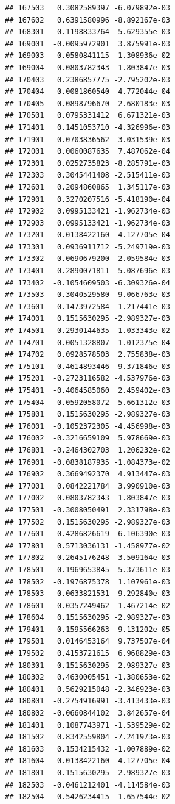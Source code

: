 \documentclass[ignorenonframetext,]{beamer}
\begin{document}
\begin{frame}[fragile]
\begin{verbatim}
## 167503   0.3082589397 -6.079892e-03
## 167602   0.6391580996 -8.892167e-03
## 168301  -0.1198833764  5.629355e-03
## 169001  -0.0095972901  3.875991e-03
## 169003  -0.0580841115  1.308936e-02
## 169004  -0.0803782343  1.803847e-03
## 170403   0.2386857775 -2.795202e-03
## 170404  -0.0081860540  4.772044e-04
## 170405   0.0898796670 -2.680183e-03
## 170501   0.0795331412  6.671321e-03
## 171401   0.1451053710 -4.326996e-03
## 171901  -0.0703836562 -3.031539e-03
## 172001   0.0060087635  7.487062e-04
## 172301   0.0252735823 -8.285791e-03
## 172303   0.3045441408 -2.515411e-03
## 172601   0.2094860865  1.345117e-03
## 172901   0.3270207516 -5.418190e-04
## 172902   0.0995133421 -1.962734e-03
## 172903   0.0995133421 -1.962734e-03
## 173201  -0.0138422160  4.127705e-04
## 173301   0.0936911712 -5.249719e-03
## 173302  -0.0690679200  2.059584e-03
## 173401   0.2890071811  5.087696e-03
## 173402  -0.1054609503 -6.309326e-04
## 173503   0.3040529580 -9.066763e-03
## 173601  -0.1473972584  1.217441e-03
## 174001   0.1515630295 -2.989327e-03
## 174501  -0.2930144635  1.033343e-02
## 174701  -0.0051328807  1.012375e-04
## 174702   0.0928578503  2.755838e-03
## 175101   0.4614893446 -9.371846e-03
## 175201  -0.2723116582 -4.537976e-03
## 175401  -0.4064585060  2.459402e-03
## 175404   0.0592058072  5.661312e-03
## 175801   0.1515630295 -2.989327e-03
## 176001  -0.1052372305 -4.456998e-03
## 176002  -0.3216659109  5.978669e-03
## 176801  -0.2464302703  1.206232e-02
## 176901  -0.0838187935 -1.084373e-02
## 176902   0.3669492370  4.913447e-03
## 177001   0.0842221784  3.990910e-03
## 177002  -0.0803782343  1.803847e-03
## 177501  -0.3008050491  2.331798e-03
## 177502   0.1515630295 -2.989327e-03
## 177601  -0.4286826619  6.106390e-03
## 177801   0.5713036131 -1.458977e-02
## 177802   0.2645176248 -3.509164e-03
## 178501   0.1969653845 -5.373611e-03
## 178502  -0.1976875378  1.107961e-03
## 178503   0.0633821531  9.292840e-03
## 178601   0.0357249462  1.467214e-02
## 178604   0.1515630295 -2.989327e-03
## 179401   0.1595566263  9.131202e-05
## 179501   0.0146453164  9.737507e-04
## 179502   0.4153721615  6.968829e-03
## 180301   0.1515630295 -2.989327e-03
## 180302   0.4630005451 -1.380653e-02
## 180401   0.5629215048 -2.346923e-03
## 180801  -0.2754916991 -3.413433e-03
## 180802  -0.0660844102  3.842657e-04
## 181401   0.1087743971 -1.539529e-02
## 181502   0.8342559804 -7.241973e-03
## 181603   0.1534215432 -1.007889e-02
## 181604  -0.0138422160  4.127705e-04
## 181801   0.1515630295 -2.989327e-03
## 182503  -0.0461212401 -4.114584e-03
## 182504   0.5426234415 -1.657544e-02

\end{verbatim}
\end{frame}
\end{document}
